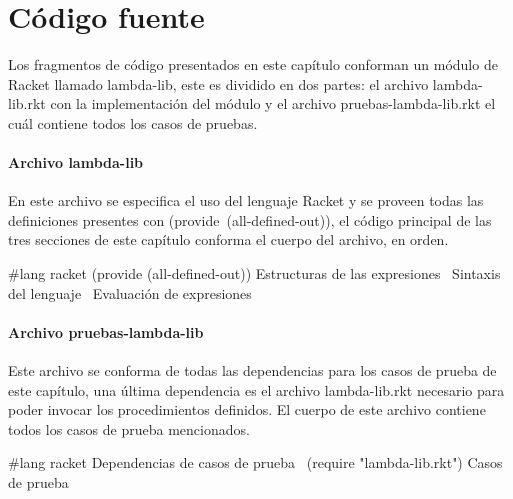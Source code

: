 \documentclass[letterpaper, twoside, openright, 11pt]{book}%
\begin{document}
\section{Código fuente}

Los fragmentos de código presentados en este capítulo conforman un módulo de {\Tt{}Racket\nwendquote} llamado {\Tt{}lambda-lib\nwendquote}, este es dividido en dos partes: el archivo {\Tt{}lambda-lib.rkt\nwendquote} con la implementación del módulo y el archivo {\Tt{}pruebas-lambda-lib.rkt\nwendquote} el cuál contiene todos los casos de pruebas.

\paragraph{Archivo {\Tt{}lambda-lib\nwendquote}} En este archivo se especifica el uso del lenguaje {\Tt{}Racket\nwendquote} y se proveen todas las definiciones presentes con {\Tt{}(provide\ (all-defined-out))\nwendquote}, el código principal de las tres secciones de este capítulo conforma el cuerpo del archivo, en orden.

\nwenddocs{}\endmoddef\nwstartdeflinemarkup\nwenddeflinemarkup
#lang racket
(provide (all-defined-out))
\LA{}Estructuras de las expresiones~{\nwtagstyle{}}\RA{}
\LA{}Sintaxis del lenguaje~{\nwtagstyle{}}\RA{}
\LA{}Evaluación de expresiones~{\nwtagstyle{}}\RA{}
\nwendcode{}\nwdocspar

\paragraph{Archivo {\Tt{}pruebas-lambda-lib\nwendquote}} Este archivo se conforma de todas las dependencias para los casos de prueba de este capítulo, una última dependencia es el archivo {\Tt{}lambda-lib.rkt\nwendquote} necesario para poder invocar los procedimientos definidos. El cuerpo de este archivo contiene todos los casos de prueba mencionados.

\nwenddocs{}\endmoddef\nwstartdeflinemarkup\nwenddeflinemarkup
#lang racket
\LA{}Dependencias de casos de prueba~{\nwtagstyle{}}\RA{}
(require "lambda-lib.rkt")
\LA{}Casos de prueba~{\nwtagstyle{}}\RA{}
\nwendcode{}\nwdocspar
\end{document}
